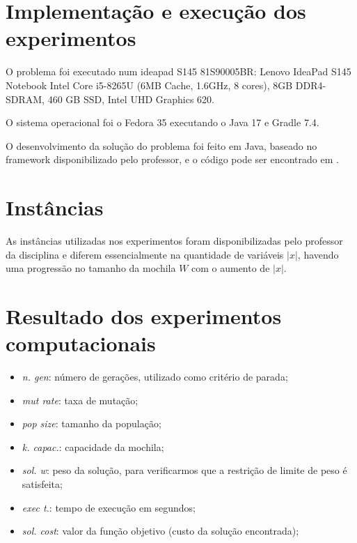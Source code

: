 \documentclass[11pt]{article}
\begin{document}
\begin{appendices}

\section{Implementação e execução dos experimentos}

O problema foi executado num ideapad S145 81S90005BR: Lenovo IdeaPad S145 Notebook Intel Core i5-8265U (6MB Cache, 1.6GHz, 8 cores), 8GB DDR4-SDRAM, 460 GB SSD, Intel UHD Graphics 620.

O sistema operacional foi o Fedora 35 executando o Java 17 e Gradle 7.4.

O desenvolvimento da solução do problema foi feito em Java, baseado no framework disponibilizado pelo professor, e o código pode ser encontrado em \cite{bib:github}.

\section{Instâncias}

As instâncias utilizadas nos experimentos foram disponibilizadas pelo professor da disciplina e diferem essencialmente na quantidade de variáveis $|x|$, havendo uma progressão no tamanho da mochila $W$ com o aumento de $|x|$.

\section{Resultado dos experimentos computacionais}

\begin{itemize}
    \item \textit{n. gen}: número de gerações, utilizado como critério de parada;
    \item \textit{mut rate}: taxa de mutação;
    \item \textit{pop size}: tamanho da população;
    \item \textit{k. capac.}: capacidade da mochila;
    \item \textit{sol. w}: peso da solução, para verificarmos que a restrição de limite de peso é satisfeita;
    \item \textit{exec t.}: tempo de execução em segundos;
    \item \textit{sol. cost}: valor da função objetivo (custo da solução encontrada);
\end{itemize}








\end{appendices}
\end{document}
